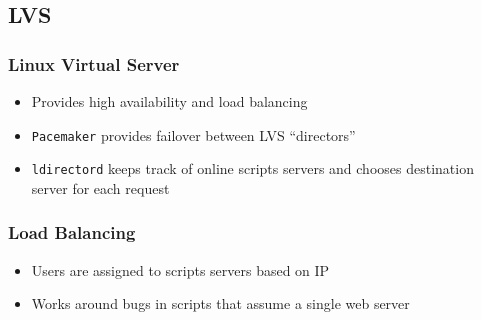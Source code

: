 \subsection{LVS}

\begin{frame}
  \frametitle{Linux Virtual Server}
  \begin{itemize}
    \item Provides high availability and load balancing
    \item {\tt Pacemaker} provides failover between LVS ``directors''
    \item {\tt ldirectord} keeps track of online scripts servers and chooses destination server for each request
  \end{itemize}
\end{frame}

\begin{frame}
  \frametitle{Load Balancing}
  \begin{itemize}
    \item Users are assigned to scripts servers based on IP
    \item Works around bugs in scripts that assume a single web server
  \end{itemize}
  \begin{center}
  \end{center}
\end{frame}

